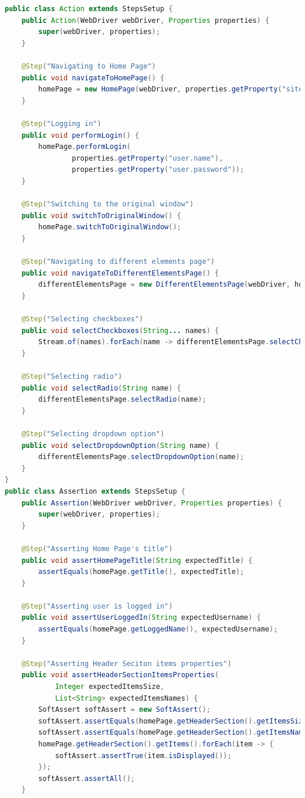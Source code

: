 \documentclass[a4paper]{article}
\begin{document}
    \begin{lstlisting}[language=Java]
public class Action extends StepsSetup {
    public Action(WebDriver webDriver, Properties properties) {
        super(webDriver, properties);
    }

    @Step("Navigating to Home Page")
    public void navigateToHomePage() {
        homePage = new HomePage(webDriver, properties.getProperty("site.url"));
    }

    @Step("Logging in")
    public void performLogin() {
        homePage.performLogin(
                properties.getProperty("user.name"),
                properties.getProperty("user.password"));
    }

    @Step("Switching to the original window")
    public void switchToOriginalWindow() {
        homePage.switchToOriginalWindow();
    }

    @Step("Navigating to different elements page")
    public void navigateToDifferentElementsPage() {
        differentElementsPage = new DifferentElementsPage(webDriver, homePage);
    }

    @Step("Selecting checkboxes")
    public void selectCheckboxes(String... names) {
        Stream.of(names).forEach(name -> differentElementsPage.selectCheckbox(name));
    }

    @Step("Selecting radio")
    public void selectRadio(String name) {
        differentElementsPage.selectRadio(name);
    }

    @Step("Selecting dropdown option")
    public void selectDropdownOption(String name) {
        differentElementsPage.selectDropdownOption(name);
    }
}
public class Assertion extends StepsSetup {
    public Assertion(WebDriver webDriver, Properties properties) {
        super(webDriver, properties);
    }

    @Step("Asserting Home Page's title")
    public void assertHomePageTitle(String expectedTitle) {
        assertEquals(homePage.getTitle(), expectedTitle);
    }

    @Step("Asserting user is logged in")
    public void assertUserLoggedIn(String expectedUsername) {
        assertEquals(homePage.getLoggedName(), expectedUsername);
    }

    @Step("Asserting Header Seciton items properties")
    public void assertHeaderSectionItemsProperties(
            Integer expectedItemsSize,
            List<String> expectedItemsNames) {
        SoftAssert softAssert = new SoftAssert();
        softAssert.assertEquals(homePage.getHeaderSection().getItemsSize(), expectedItemsSize);
        softAssert.assertEquals(homePage.getHeaderSection().getItemsNames(), expectedItemsNames);
        homePage.getHeaderSection().getItems().forEach(item -> {
            softAssert.assertTrue(item.isDisplayed());
        });
        softAssert.assertAll();
    }


\end{lstlisting}
\end{document}
